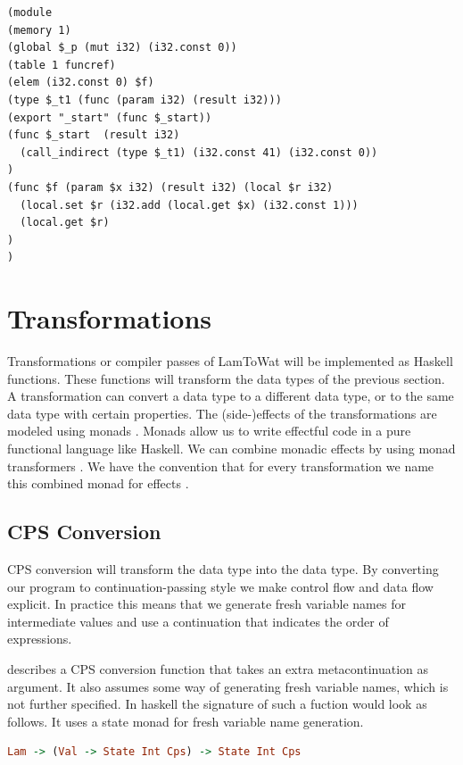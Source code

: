 {\begin{lstlisting}
(module
(memory 1)
(global $_p (mut i32) (i32.const 0))
(table 1 funcref)
(elem (i32.const 0) $f)
(type $_t1 (func (param i32) (result i32)))
(export "_start" (func $_start))
(func $_start  (result i32) 
  (call_indirect (type $_t1) (i32.const 41) (i32.const 0))
)
(func $f (param $x i32) (result i32) (local $r i32)
  (local.set $r (i32.add (local.get $x) (i32.const 1)))
  (local.get $r)
)
)
\end{lstlisting}

\section{\label{section:transforms}Transformations}
Transformations or compiler passes of LamToWat will be implemented as Haskell functions. These functions will transform the data types of the previous section. A transformation can convert a data type to a different data type, or to the same data type with certain properties. The (side-)effects of the transformations are modeled using monads \autocite{DBLP:conf/lics/Moggi89}. Monads allow us to write effectful code in a pure functional language like Haskell. We can combine monadic effects by using monad transformers \autocite{DBLP:conf/popl/LiangHJ95}. We have the convention that for every transformation we name this combined monad for effects .

\subsection{\label{subsection:cpsconvert}CPS Conversion}
CPS conversion will transform the  data type into the  data type. By converting our program to continuation-passing style we make control flow and data flow explicit. In practice this means that we generate fresh variable names for intermediate values and use a continuation that indicates the order of expressions.

\citeauthor{DBLP:books/daglib/0022396} describes a CPS conversion function that takes an extra metacontinuation as argument. It also assumes some way of generating fresh variable names, which is not further specified. In haskell the signature of such a fuction would look as follows. It uses a state monad for fresh variable name generation.

\begin{lstlisting}[language=Haskell]
Lam -> (Val -> State Int Cps) -> State Int Cps
\end{lstlisting}

}
